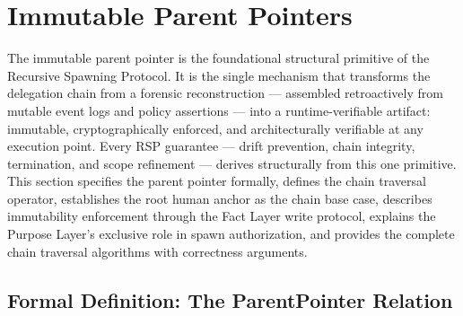 \section{Immutable Parent Pointers}
\label{sec:immutable-parent-pointers}

The immutable parent pointer is the foundational structural primitive of the Recursive Spawning Protocol. It is the single mechanism that transforms the delegation chain from a forensic reconstruction — assembled retroactively from mutable event logs and policy assertions — into a runtime-verifiable artifact: immutable, cryptographically enforced, and architecturally verifiable at any execution point. Every RSP guarantee — drift prevention, chain integrity, termination, and scope refinement — derives structurally from this one primitive. This section specifies the parent pointer formally, defines the chain traversal operator, establishes the root human anchor as the chain base case, describes immutability enforcement through the Fact Layer write protocol, explains the Purpose Layer's exclusive role in spawn authorization, and provides the complete chain traversal algorithms with correctness arguments.

\subsection{Formal Definition: The ParentPointer Relation}
\label{sec:parent-pointer-formal}

